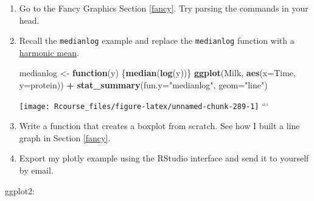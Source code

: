 \documentclass[]{book}
\newenvironment{Shaded}{\begin{snugshade}}{\end{snugshade}}
\newcommand{\KeywordTok}[1]{\textcolor[rgb]{0.13,0.29,0.53}{\textbf{#1}}}
\newcommand{\DataTypeTok}[1]{\textcolor[rgb]{0.13,0.29,0.53}{#1}}
\newcommand{\StringTok}[1]{\textcolor[rgb]{0.31,0.60,0.02}{#1}}
\newcommand{\ControlFlowTok}[1]{\textcolor[rgb]{0.13,0.29,0.53}{\textbf{#1}}}
\newcommand{\OperatorTok}[1]{\textcolor[rgb]{0.81,0.36,0.00}{\textbf{#1}}}
\newcommand{\NormalTok}[1]{#1}
\theoremstyle{definition}
\theoremstyle{definition}
\theoremstyle{definition}
\theoremstyle{remark}
\begin{document}
\begin{enumerate}
\def\labelenumi{\arabic{enumi}.}
\item
  Go to the Fancy Graphics Section \ref{fancy}. Try parsing the commands
  in your head.
\item
  Recall the \texttt{medianlog} example and replace the
  \texttt{medianlog} function with a
  \href{https://en.wikipedia.org/wiki/Harmonic_mean}{harmonic mean}.

\begin{Shaded}
\begin{Highlighting}[]
\NormalTok{medianlog <-}\StringTok{ }\ControlFlowTok{function}\NormalTok{(y) \{}\KeywordTok{median}\NormalTok{(}\KeywordTok{log}\NormalTok{(y))\}}
\KeywordTok{ggplot}\NormalTok{(Milk, }\KeywordTok{aes}\NormalTok{(}\DataTypeTok{x=}\NormalTok{Time, }\DataTypeTok{y=}\NormalTok{protein)) }\OperatorTok{+}
\StringTok{  }\KeywordTok{stat_summary}\NormalTok{(}\DataTypeTok{fun.y=}\StringTok{"medianlog"}\NormalTok{, }\DataTypeTok{geom=}\StringTok{"line"}\NormalTok{)}
\end{Highlighting}
\end{Shaded}

  \texttt{[image: Rcourse\_files/figure-latex/unnamed-chunk-289-1]}
  ```
\item
  Write a function that creates a boxplot from scratch. See how I built
  a line graph in Section \ref{fancy}.
\item
  Export my plotly example using the RStudio interface and send it to
  yourself by email.
\end{enumerate}

ggplot2:
\end{document}
